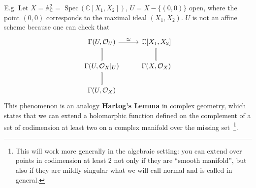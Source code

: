 \documentclass[11pt]{article}
\newcommand{\spec}{\text{ Spec}\,}
\newcommand{\affn}{\mathbb A}
\newcommand{\cplx}{\mathbb C}
\newcommand{\calo}{{\cal O}}
\begin{document}
E.g.
 Let $X=\affn^2_\cplx=\spec(\cplx[X_1,X_2])$, $U=X-\{(0,0)\}$ open, where the point $(0,0)$ corresponds to the maximal ideal $(X_1,X_2)$. $U$ is not  an affine scheme because one can check that 
$$
\begin{tikzcd}
\Gamma(U,\calo_U) \arrow[d, equal] \arrow[r, "\simeq"] & \cplx[X_1,X_2] \arrow[d,equal] \\
\Gamma(U,\calo_X|_U) \arrow[d,equal] & \Gamma(X,\calo_X) \\
\Gamma(U,\calo_X) & 
\end{tikzcd}
$$
This phenomenon is an analogy \textbf{Hartog's Lemma} in complex geometry, which states that we can extend a holomorphic function defined on the complement of a set of codimension at least two on a complex manifold over the missing set~\footnote{This will work more generally in the algebraic setting: you can extend over points in codimension at least $2$ not only if they are ``smooth manifold'', but also if they are mildly singular what we will call normal and is called  in general.}.
\end{document}
